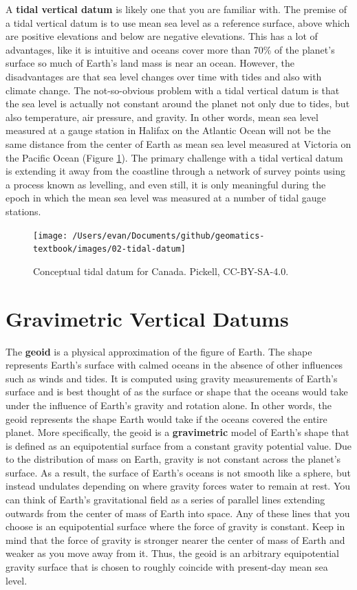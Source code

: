 \documentclass[
]{book}
\begin{document}
A \textbf{tidal vertical datum} is likely one that you are familiar with. The premise of a tidal vertical datum is to use mean sea level as a reference surface, above which are positive elevations and below are negative elevations. This has a lot of advantages, like it is intuitive and oceans cover more than 70\% of the planet's surface so much of Earth's land mass is near an ocean. However, the disadvantages are that sea level changes over time with tides and also with climate change. The not-so-obvious problem with a tidal vertical datum is that the sea level is actually not constant around the planet not only due to tides, but also temperature, air pressure, and gravity. In other words, mean sea level measured at a gauge station in Halifax on the Atlantic Ocean will not be the same distance from the center of Earth as mean sea level measured at Victoria on the Pacific Ocean (Figure \ref{fig:2-tidal-datum}). The primary challenge with a tidal vertical datum is extending it away from the coastline through a network of survey points using a process known as levelling, and even still, it is only meaningful during the epoch in which the mean sea level was measured at a number of tidal gauge stations.

\begin{figure}
\texttt{[image: /Users/evan/Documents/github/geomatics-textbook/images/02-tidal-datum]} \caption{Conceptual tidal datum for Canada. Pickell, CC-BY-SA-4.0.}\label{fig:2-tidal-datum}
\end{figure}

\hypertarget{gravimetric-vertical-datums}{%
\section{Gravimetric Vertical Datums}\label{gravimetric-vertical-datums}}

The \textbf{geoid} is a physical approximation of the figure of Earth. The shape represents Earth's surface with calmed oceans in the absence of other influences such as winds and tides. It is computed using gravity measurements of Earth's surface and is best thought of as the surface or shape that the oceans would take under the influence of Earth's gravity and rotation alone. In other words, the geoid represents the shape Earth would take if the oceans covered the entire planet. More specifically, the geoid is a \textbf{gravimetric} model of Earth's shape that is defined as an equipotential surface from a constant gravity potential value. Due to the distribution of mass on Earth, gravity is not constant across the planet's surface. As a result, the surface of Earth's oceans is not smooth like a sphere, but instead undulates depending on where gravity forces water to remain at rest. You can think of Earth's gravitational field as a series of parallel lines extending outwards from the center of mass of Earth into space. Any of these lines that you choose is an equipotential surface where the force of gravity is constant. Keep in mind that the force of gravity is stronger nearer the center of mass of Earth and weaker as you move away from it. Thus, the geoid is an arbitrary equipotential gravity surface that is chosen to roughly coincide with present-day mean sea level.
\end{document}
